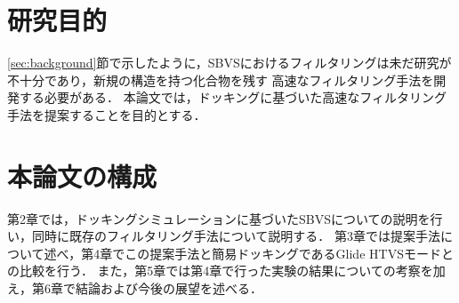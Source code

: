 
\section{研究目的}
\ref{sec:background}節で示したように，SBVSにおけるフィルタリングは未だ研究が不十分であり，新規の構造を持つ化合物を残す
高速なフィルタリング手法を開発する必要がある．
本論文では，ドッキングに基づいた高速なフィルタリング手法を提案することを目的とする．

\section{本論文の構成}
第2章では，ドッキングシミュレーションに基づいたSBVSについての説明を行い，同時に既存のフィルタリング手法について説明する．
第3章では提案手法について述べ，第4章でこの提案手法と簡易ドッキングであるGlide HTVSモードとの比較を行う．
また，第5章では第4章で行った実験の結果についての考察を加え，第6章で結論および今後の展望を述べる．